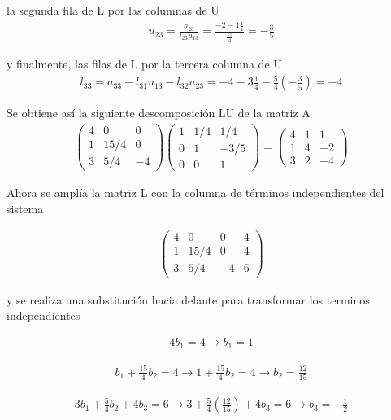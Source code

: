 \documentclass[a4paper, 12pt]{article}
\begin{document}
la segunda fila de L por las columnas de U
\begin{align*}
u_{23} = \frac{a_{23}}{l_{23}u_{13}} =
\frac{-2 - 1\frac{1}{4}}{\frac{15}{4}} = -\frac{3}{5}
\end{align*}

y finalmente, las filas de L por la tercera columna de U
\begin{align*}
l_{33} = a_{33} - l_{31}u_{13} - l_{32}u_{23} =
-4 - 3\frac{1}{4} - \frac{5}{4}(-\frac{3}{5}) = -4
\end{align*}

Se obtiene así la siguiente descomposición LU de la matriz A
\begin{align*}
\begin{pmatrix}
  4 & 0 & 0\\
  1 & 15/4 & 0\\
  3 & 5/4 & -4
\end{pmatrix} 
\begin{pmatrix}
  1 & 1/4 & 1/4\\
  0 & 1 & -3/5\\
  0 & 0 & 1
\end{pmatrix}
=
\begin{pmatrix}
  4 & 1 & 1\\
  1 & 4 & -2\\
  3 & 2 & -4
\end{pmatrix}
\end{align*}

Ahora se amplía la matriz L con la columna de términos independientes del
sistema

\begin{align*}
\begin{pmatrix}
  4 & 0 & 0 & 4\\
  1 & 15/4 & 0 & 4 \\
  3 & 5/4 & -4 & 6
\end{pmatrix}
\end{align*}

y se realiza una substitución hacia delante para transformar los terminos
independientes

\begin{align*}
4b_1 = 4
\rightarrow
b_1 = 1
\end{align*}

\begin{align*}
b_1 + \frac{15}{4}b_2 = 4 
\rightarrow
1 + \frac{15}{4}b_2 = 4
\rightarrow
b_2 = \frac{12}{15}
\end{align*}

\begin{align*}
3b_1 + \frac{5}{4}b_2 + 4b_3 = 6 
\rightarrow
3 + \frac{5}{4}(\frac{12}{15}) + 4b_3 = 6
\rightarrow
b_3 = -\frac{1}{2}
\end{align*}
\end{document}
